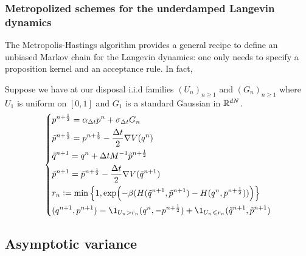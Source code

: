     \subsubsection*{Metropolized schemes for the underdamped Langevin dynamics}
    The Metropolis-Hastings algorithm provides a general recipe to define an unbiased Markov chain for the Langevin dynamics: one only needs to specify a proposition kernel and an acceptance rule.
    In fact, 

    \begin{example}
        Suppose we have at our disposal i.i.d families $(U_n)_{n\geq1}$ and $(G_n)_{n\geq 1}$ where $U_1$ is uniform on $[0,1]$ and $G_1$ is a standard Gaussian in $\mathbb{R}^{dN}$.
            \begin{equation}\label{ghmc}
                \left\{\begin{aligned}
                     &p^{n+\frac12} =\alpha_{\Delta t}p^n +\sigma_{\Delta t}G_n\\
                     &\tilde p^{n+\frac12} =p^{n+\frac 12} - \frac{\Delta t}{2} \nabla V(q^n)\\
                     &\tilde q^{n+1} =q^n+\Delta t M^{-1} \tilde p^{n+\frac 12}\\
                     &\tilde p^{n+1} =\tilde p^{n+\frac12} - \frac{\Delta t}{2} \nabla V(\tilde q^{n+1})\\
                     &r_n \defeq \min\left\{1,\exp(-\beta(H(\tilde q^{n+1},\tilde p^{n+1})-H(q^n,p^{n+\frac12})))\right\}\\
                     &(q^{n+1},p^{n+1}) = \1_{U_n > r_n}(q^n,-p^{n+\frac12})+\1_{U_n\leq r_n}(\tilde q^{n+1},\tilde p^{n+1})
                \end{aligned}\right.
            \end{equation}
        \end{example}

\subsection{Asymptotic variance}

